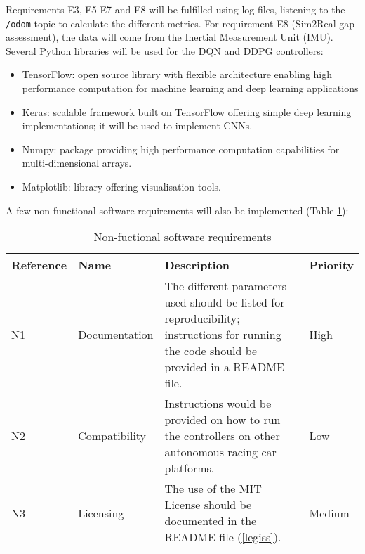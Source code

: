 Requirements E3, E5 E7 and E8 will be fulfilled using log files, listening to the \verb |/odom| topic to calculate the different metrics. For requirement E8 (Sim2Real gap assessment), the data will come from the Inertial Measurement Unit (IMU). \\

Several Python libraries will be used for the DQN and DDPG controllers:
\begin{itemize}
	\item TensorFlow: open source library with flexible architecture enabling high performance computation for machine learning and deep learning applications
	\item Keras: scalable framework built on TensorFlow offering simple deep learning implementations; it will be used to implement CNNs.
	\item Numpy: package providing high performance computation capabilities for multi-dimensional arrays.
	\item Matplotlib: library offering visualisation tools.
\end{itemize}

A few non-functional software requirements will also be implemented (Table \ref{nonfuncsoreqtab}):

\begin{table}[H]
\centering
\begin{tabularx}{\textwidth}{||l|X|X|l||} 
 \hline
 Reference & Name & Description & Priority\\ [0.5ex] 
 \hline\hline
 N1 & Documentation & The different parameters used should be listed for reproducibility; instructions for running the code should be provided in a README file. & High\\
 \hline
 N2 & Compatibility & Instructions would be provided on how to run the controllers on other autonomous racing car platforms. & Low\\
  \hline
 N3 & Licensing & The use of the MIT License should be documented in the README file (\ref{legiss}). & Medium\\
  \hline
\end{tabularx}
\caption{Non-fuctional software requirements}
\label{nonfuncsoreqtab}
\end{table}


